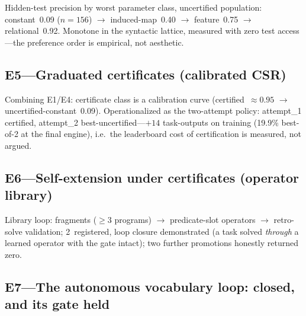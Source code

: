 \documentclass[11pt]{article}
\begin{document}
Hidden-test precision by worst parameter class, uncertified population:
constant~0.09 ($n{=}156$) $\to$ induced-map~0.40 $\to$ feature~0.75 $\to$
relational~0.92.  Monotone in the syntactic lattice, measured with zero
test access---the preference order is empirical, not aesthetic.

\subsection{E5---Graduated certificates (calibrated CSR)}

Combining E1/E4: certificate class is a calibration curve
(certified~$\approx 0.95$ $\to$ uncertified-constant~0.09).
Operationalized as the two-attempt policy: attempt\_1 certified, attempt\_2
best-uncertified---$+14$ task-outputs on training (19.9\% best-of-2 at the
final engine), i.e.\ the leaderboard cost of certification is measured,
not argued.

\subsection{E6---Self-extension under certificates (operator library)}

Library loop: fragments ($\ge 3$ programs) $\to$ predicate-slot operators
$\to$ retro-solve validation; 2~registered, loop closure demonstrated (a
task solved \emph{through} a learned operator with the gate intact); two
further promotions honestly returned zero.

\subsection{E7---The autonomous vocabulary loop: closed, and its gate held}
\end{document}
